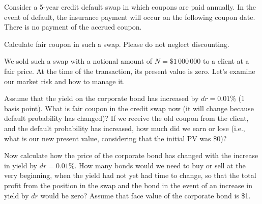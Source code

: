 \documentclass[a4paper,14pt]{extarticle}
\begin{document}
Consider a 5-year credit default swap in which coupons are paid annually. In the event of default, the insurance payment will occur on the following coupon date. There is no payment of the accrued coupon.

Calculate fair coupon in such a swap. Please do not neglect discounting.

We sold such a swap with a notional amount of $N=\$1\,000\,000$ to a client at a fair price. At the time of the transaction, its present value is zero. Let's examine our market risk and how to manage it.

Assume that the yield on the corporate bond has increased by $dr=0.01\%$ (1 basis point). What is fair coupon in the credit swap now (it will change because default probability has changed)? If we receive the old coupon from the client, and the default probability has increased, how much did we earn or lose (i.e., what is our new present value, considering that the initial PV was \$0)?

Now calculate how the price of the corporate bond has changed with the increase in yield by $dr=0.01\%$. How many bonds would we need to buy or sell at the very beginning, when the yield had not yet had time to change, so that the total profit from the position in the swap and the bond in the event of an increase in yield by $dr$ would be zero? Assume that face value of the corporate bond is \$1.
\end{document}
